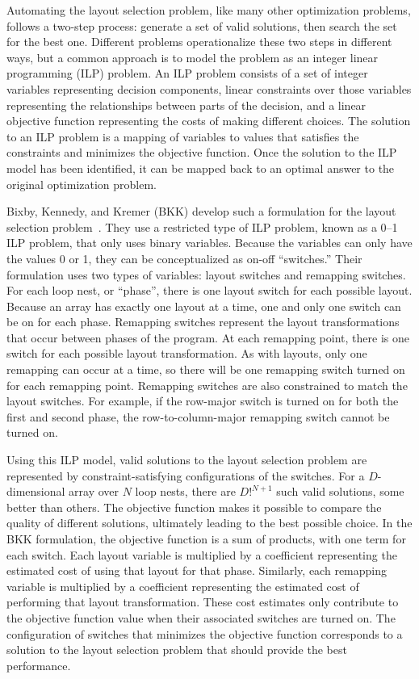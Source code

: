 Automating the layout selection problem, like many other optimization problems, follows a two-step process: generate a set of valid solutions, then search the set for the best one.
Different problems operationalize these two steps in different ways, but a common approach is to model the problem as an integer linear programming (ILP) problem.
An ILP problem consists of a set of integer variables representing decision components, linear constraints over those variables representing the relationships between parts of the decision, and a linear objective function representing the costs of making different choices.
The solution to an ILP problem is a mapping of variables to values that satisfies the constraints and minimizes the objective function.
Once the solution to the ILP model has been identified, it can be mapped back to an optimal answer to the original optimization problem.

Bixby, Kennedy, and Kremer (BKK) develop such a formulation for the layout selection problem~\cite{bixby1994automatic,kennedy1995automatic,kennedy1998automatic}.
They use a restricted type of ILP problem, known as a 0--1 ILP problem, that only uses binary variables.
Because the variables can only have the values 0 or 1, they can be conceptualized as on-off ``switches.''
Their formulation uses two types of variables: layout switches and remapping switches.
For each loop nest, or ``phase'', there is one layout switch for each possible layout.
Because an array has exactly one layout at a time, one and only one switch can be on for each phase.
Remapping switches represent the layout transformations that occur between phases of the program.
At each remapping point, there is one switch for each possible layout transformation.
As with layouts, only one remapping can occur at a time, so there will be one remapping switch turned on for each remapping point.
Remapping switches are also constrained to match the layout switches.
For example, if the row-major switch is turned on for both the first and second phase, the row-to-column-major remapping switch cannot be turned on.

Using this ILP model, valid solutions to the layout selection problem are represented by constraint-satisfying configurations of the switches.
For a $D$-dimensional array over $N$ loop nests, there are $D!^{N+1}$ such valid solutions, some better than others.
The objective function makes it possible to compare the quality of different solutions, ultimately leading to the best possible choice.
In the BKK formulation, the objective function is a sum of products, with one term for each switch.
Each layout variable is multiplied by a coefficient representing the estimated cost of using that layout for that phase.
Similarly, each remapping variable is multiplied by a coefficient representing the estimated cost of performing that layout transformation.
These cost estimates only contribute to the objective function value when their associated switches are turned on.
The configuration of switches that minimizes the objective function corresponds to a solution to the layout selection problem that should provide the best performance.

